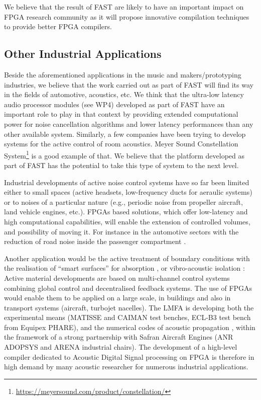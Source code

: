 \documentclass[a4paper,9pt]{extarticle}
\newcommand{\PP}{FAST}
\newcommand{\projectname}[0]{\PP}
\begin{document}
We believe that the result of {\projectname} are likely to have an important impact on FPGA research community as it will propose innovative compilation techniques to provide better FPGA compilers.

\subsection{Other Industrial Applications}

Beside the aforementioned applications in the music and makers/prototyping industries, we believe that the work carried out as part of \PP{} will find its way in the fields of automotive, acoustics, etc. We think that the ultra-low latency audio processor modules (see WP4) developed as part of \PP{} have an important role to play in that context by providing extended computational power for noise cancellation algorithms and lower latency performances than any other available system. Similarly, a few companies have been trying to develop systems for the active control of room acoustics. Meyer Sound Constellation System\footnote{\url{https://meyersound.com/product/constellation/}} is a good example of that. We believe that the platform developed as part of \PP{} has the potential to take this type of system to the next level. 

Industrial developments of active noise control systems have so far been limited either to small spaces (active headsets, low-frequency ducts for aeraulic systems) or to noises of a particular nature (e.g., periodic noise from propeller aircraft, land vehicle engines, etc.). 
FPGAs based solutions, which offer low-latency and high computational capabilities, will enable the extension of controlled volumes, and possibility of moving it. For instance in the automotive sectors with the reduction of road noise inside the passenger compartment \cite{jung2019local}.

Another application would be the active treatment of boundary conditions with the realisation of ``smart surfaces'' for absorption \cite{mazeaud2007multichannel,betgen2011new}, or vibro-acoustic isolation \cite{melon2012one,hu2012acoustic,zielinski2012fully}: Active material developments are based on multi-channel control systems combining global control and decentralised feedback systems. The use of FPGAs would enable them to be applied on a large scale, in buildings and also in transport systems (aircraft, turbojet nacelles). The LMFA is developing both the experimental means (MATISSE and CAIMAN test benches, ECL-B3 test bench from Equipex PHARE), and the numerical codes of acoustic propagation \cite{deng2019comparison,troian2017broadband}, within the framework of a strong partnership with Safran Aircraft Engines (ANR ADOPSYS and ARENA industrial chairs). The development of a high-level compiler dedicated to Acoustic Digital Signal processing on FPGA is therefore in high demand by many acoustic researcher for numerous industrial applications.
\end{document}
